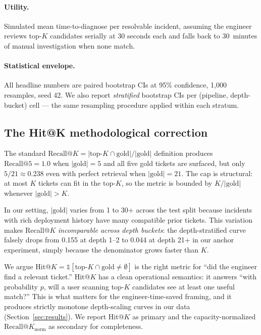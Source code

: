 \paragraph{Utility.} Simulated mean time-to-diagnose per resolvable incident, assuming the engineer reviews top-$K$ candidates serially at 30 seconds each and falls back to 30~minutes of manual investigation when none match.

\paragraph{Statistical envelope.} All headline numbers are paired bootstrap CIs at 95\% confidence, 1{,}000 resamples, seed 42. We also report \emph{stratified} bootstrap CIs per (pipeline, depth-bucket) cell --- the same resampling procedure applied within each stratum.

\subsection{The Hit@K methodological correction}
\label{sec:hitk-correction}

The standard $\text{Recall@}K = |\text{top-}K \cap \text{gold}| / |\text{gold}|$ definition produces $\text{Recall@}5 = 1.0$ when $|\text{gold}|=5$ and all five gold tickets are surfaced, but only $5/21 \approx 0.238$ even with perfect retrieval when $|\text{gold}|=21$. The cap is structural: at most $K$ tickets can fit in the top-$K$, so the metric is bounded by $K/|\text{gold}|$ whenever $|\text{gold}|>K$.

In our setting, $|\text{gold}|$ varies from 1 to 30+ across the test split because incidents with rich deployment history have many compatible prior tickets. This variation makes Recall@$K$ \emph{incomparable across depth buckets}: the depth-stratified curve falsely drops from 0.155 at depth 1--2 to 0.044 at depth 21+ in our anchor experiment, simply because the denominator grows faster than $K$.

We argue Hit@$K = \mathbb{1}[\text{top-}K \cap \text{gold} \neq \emptyset]$ is the right metric for ``did the engineer find a relevant ticket.'' Hit@$K$ has a clean operational semantics: it answers ``with probability $p$, will a user scanning top-$K$ candidates see at least one useful match?'' This is what matters for the engineer-time-saved framing, and it produces strictly monotone depth-scaling curves in our data (Section~\ref{sec:results}). We report Hit@$K$ as primary and the capacity-normalized $\text{Recall@}K_{\text{norm}}$ as secondary for completeness.

